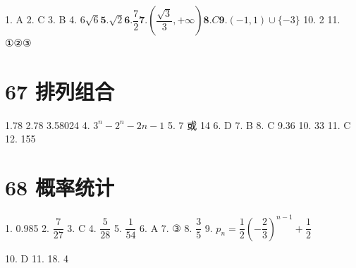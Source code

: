 \documentclass[10pt]{article}
\begin{document}
1. A 2. C 3. B 4. $6\sqrt{6}\mathbf{5}.\sqrt{2}\mathbf{6}.\dfrac{7}{2}\mathbf{7}.\left( {\dfrac{\sqrt{3}}{3}, + \infty }\right) \mathbf{8}.{C}\mathbf{9}.\left( {-1,1}\right)  \cup  \{  - 3\}$ 10. 2 11. ①②③

\section*{67 排列组合}

1.78 2.78 3.58024 4. ${3}^{n} - {2}^{n} - {2n} - 1$ 5. 7 或 14 6. D 7. B 8. C 9.36 10. 33 11. C 12. 155

\section*{68 概率统计}

1. 0.985 2. $\dfrac{7}{27}$ 3. C 4. $\dfrac{5}{28}$ 5. $\dfrac{1}{54}$ 6. A 7. ③ 8. $\dfrac{3}{5}$ 9. ${p}_{n} = \dfrac{1}{2}{\left( -\dfrac{2}{3}\right) }^{n - 1} + \dfrac{1}{2}$

10. D 11. 18. 4
\end{document}
